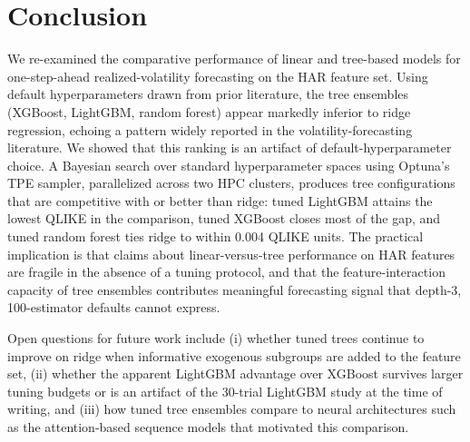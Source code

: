 \section{Conclusion}
\label{sec:conclusion}

We re-examined the comparative performance of linear and tree-based models for one-step-ahead realized-volatility forecasting on the HAR feature set. Using default hyperparameters drawn from prior literature, the tree ensembles (XGBoost, LightGBM, random forest) appear markedly inferior to ridge regression, echoing a pattern widely reported in the volatility-forecasting literature. We showed that this ranking is an artifact of default-hyperparameter choice. A Bayesian search over standard hyperparameter spaces using Optuna's TPE sampler, parallelized across two HPC clusters, produces tree configurations that are competitive with or better than ridge: tuned LightGBM attains the lowest QLIKE in the comparison, tuned XGBoost closes most of the gap, and tuned random forest ties ridge to within 0.004 QLIKE units. The practical implication is that claims about linear-versus-tree performance on HAR features are fragile in the absence of a tuning protocol, and that the feature-interaction capacity of tree ensembles contributes meaningful forecasting signal that depth-3, 100-estimator defaults cannot express.

Open questions for future work include (i) whether tuned trees continue to improve on ridge when informative exogenous subgroups are added to the feature set, (ii) whether the apparent LightGBM advantage over XGBoost survives larger tuning budgets or is an artifact of the 30-trial LightGBM study at the time of writing, and (iii) how tuned tree ensembles compare to neural architectures such as the attention-based sequence models that motivated this comparison.
